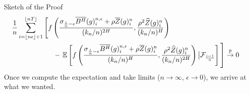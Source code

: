 \documentclass[final,hyperref={pdfpagelabels=false}]{beamer}
\newcommand{\E}{\mathbb{E}}
\begin{document}
\begin{frame}{}
\begin{columns}[t]
\begin{column}{0.4\linewidth}
\begin{block}{Sketch of the Proof}
          \begin{align*}
            \phantom{}
    &\begin{aligned}
      &\frac{1}{n}\sum_{i = \left\lfloor n\epsilon \right\rfloor + 1}^{\left\lfloor nT \right\rfloor} \left[ \vphantom{\E \left[ f\left( \frac{\sigma_{\frac{i}{n}-\epsilon}\overline{B^H}(g)^{n,\epsilon}_i + \rho\overline{Z}(g)^n_i}{(k_n/n)^{2H}}, \frac{\rho^2\widehat{Z}(g)^n_i}{(k_n/n)^H}\right) \right] } f\left( \frac{\sigma_{\frac{i}{n}-\epsilon}\overline{B^H}(g)^{n,\epsilon}_i + \rho\overline{Z}(g)^n_i}{(k_n/n)^{2H}}, \frac{\rho^2\widehat{Z}(g)^n_i}{(k_n/n)^H}\right) \right. \\ &\hspace*{2.1cm} - \left. \E\left[ f\left( \frac{\sigma_{\frac{i}{n}-\epsilon}\overline{B^H}(g)^{n,\epsilon}_i + \rho\overline{Z}(g)^n_i}{(k_n/n)^{H}}, \frac{\rho^2\widehat{Z}(g)^n_i}{(k_n/n)^{2H}}\right) \big| \mathcal{F}_{\frac{i-1}{n}} \right] \vphantom{\frac{1}{n}\sum_{i = \left\lfloor n\epsilon \right\rfloor + 1}^{\left\lfloor nT \right\rfloor}} \right] \overset{\mathbb{P}}{\rightarrow} 0
    \end{aligned}
          \end{align*}
          Once we compute the expectation and take limits (\(n \rightarrow \infty\), \(\epsilon \rightarrow 0\)), we arrive at what we wanted.
        \end{block}
      \end{column}


\end{columns}
\end{frame}
\end{document}
